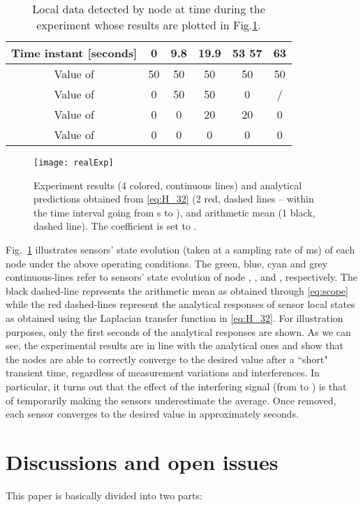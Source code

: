 \documentclass[journal]{IEEEtran}
\begin{document}
{\begin{table}[t]
  \caption{Local data  detected by node  at time  during the experiment whose results are plotted in Fig.\ref{fig:realExpPlot}.}
  \label{tbl:localData}
  \centering
  \begin{tabular}{| c || c | c | c | c | c |} 
  \hline   
 Time instant  [seconds] & 0  & 9.8     & 19.9 & 53  57			& 63\\\hline
 \hline  
 Value of & 50& 50     & 50 & 50			&50\\\hline
 Value of &  0 & 	 50 & 50 &  0& \slash \\\hline
 Value of & 0  & 	 0   & 20 & 20			& 0\\\hline
 Value of &  0 & 	 0   & 0   & 0			& 0\\
   \hline 
  \end{tabular}
\end{table} 
\begin{figure}
\centering
\texttt{[image: realExp]}
\caption{Experiment results (4 colored, continuous lines) and analytical predictions obtained from \eqref{eq:H_32} (2 red, dashed lines -- within the time interval going from s to ), and arithmetic mean (1 black, dashed line). The  coefficient is set to . 
}
\label{fig:realExpPlot}
\end{figure}
Fig.~\ref{fig:realExpPlot} illustrates sensors' state  evolution (taken at a sampling rate of  ms) of each node  under the above operating conditions. The green, blue, cyan and grey continuous-lines refer to sensors' state  evolution of node , ,  and , respectively.
{The black dashed-line represents the arithmetic mean as obtained through \eqref{eq:scope} while the red dashed-lines represent the analytical responses of sensor local states as obtained using the Laplacian transfer function in \eqref{eq:H_32}. For illustration purposes, only the first  seconds of the analytical responses are shown. As we can see, the experimental results are in line with the analytical ones and show that the nodes are able to correctly converge to the desired value after a ``short" transient time, regardless of measurement variations and interferences. In particular, it turns out that the effect of the interfering signal (from  to ) is that of temporarily making the sensors underestimate the average. Once removed, each sensor converges to the desired value in approximately  seconds.}

\section{Discussions and open issues}\label{sec:Discussion}
{This paper is basically divided into two parts:}

}
\end{document}

